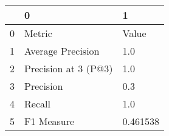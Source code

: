 \begin{tabular}{lll}
\toprule
{} &                     0 &         1 \\
\midrule
0 &                Metric &     Value \\
1 &     Average Precision &       1.0 \\
2 &  Precision at 3 (P@3) &       1.0 \\
3 &             Precision &       0.3 \\
4 &                Recall &       1.0 \\
5 &            F1 Measure &  0.461538 \\
\bottomrule
\end{tabular}
